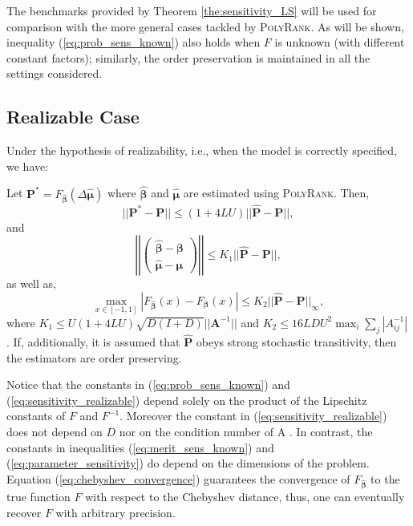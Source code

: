 \documentclass[twoside,11pt]{article}
\begin{document}
The benchmarks provided by Theorem \ref{the:sensitivity_LS} will be used for comparison with the more general cases tackled by \textsc{PolyRank}. As will be shown, inequality (\ref{eq:prob_sens_known}) also holds when $F$ is unknown (with different constant factors); similarly, the order preservation is maintained in all the settings considered.  

\subsection{Realizable Case} Under the hypothesis of  realizability, i.e., when the model is correctly specified, we have:

\begin{theorem}%
\label{the:sensitivity_realizable}
Let $\boldsymbol{P^*} = F_{\boldsymbol{\hat{\beta}}}\left(\Delta \boldsymbol{\hat{\mu}}\right)$ where $\boldsymbol{\hat{\beta}}$ and $\boldsymbol{\hat{\mu}}$ are estimated using \textsc{PolyRank}. Then, 
  \begin{equation}
  \label{eq:sensitivity_realizable}||  \boldsymbol{P^*} - \boldsymbol{P}|| \leq (1+4LU)  ||\boldsymbol{\hat{P}} - \boldsymbol{P}||,\end{equation}
and 
\begin{equation}
\label{eq:parameter_sensitivity}\left|\left|\left(\begin{array}{c}
     \boldsymbol{\hat{\beta}} -\boldsymbol{\beta}\\
     \boldsymbol{\hat{\mu}} -\boldsymbol{\mu} 
\end{array}\right) \right|\right| \leq K_1 ||\boldsymbol{\hat{P}} - \boldsymbol{P}||,\end{equation}
as well as,
\begin{equation}
\label{eq:chebyshev_convergence}
\max_{x \in [-1,1] }|F_{\boldsymbol{\hat \beta}}(x) - F_{\boldsymbol{\beta}}(x)| \leq K_2 ||\boldsymbol{\hat{P}} - \boldsymbol{P}||_{\infty},
\end{equation}
where  $K_1 \leq U(1+4LU)\sqrt{D(I+D)} || \boldsymbol{A}^{-1}||$ and $K_2 \leq 16 LDU^2 \max_{i} \sum_j|A_{ij}^{-1}|$. If, additionally, it is assumed that $\boldsymbol{\hat P}$ obeys strong stochastic transitivity, then the estimators are order preserving.
\end{theorem}
Notice that the constants in (\ref{eq:prob_sens_known}) and (\ref{eq:sensitivity_realizable}) depend solely on the product of the Lipschitz constants of $F$ and $F^{-1}$. Moreover the constant in (\ref{eq:sensitivity_realizable}) does not depend on $D$ nor on the condition number of A . In contrast, the constants in inequalities (\ref{eq:merit_sens_known}) and (\ref{eq:parameter_sensitivity}) do depend on the dimensions of the problem. Equation (\ref{eq:chebyshev_convergence}) guarantees the convergence of $F_{\boldsymbol{\hat \beta}}$ to the true function $F$ with respect to the Chebyshev distance, thus, one can eventually recover $F$ with arbitrary precision. 
\end{document}
